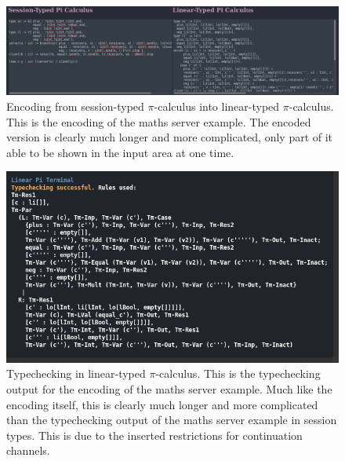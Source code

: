 \documentclass{l4proj}
\begin{document}
\begin{figure}[H]
\centering
\includegraphics[width=\textwidth]{images/InterfaceScreenshotEnc.png}
\caption{Encoding from session-typed $\pi$-calculus into linear-typed $\pi$-calculus. This is the encoding of the maths server example. The encoded version is clearly much longer and more complicated, only part of it able to be shown in the input area at one time.}
\label{fig:scshEnc}
\end{figure}
\begin{figure}[H]
\centering
\includegraphics[width=\textwidth]{images/InterfaceScreenshotLinTCh.png}
\caption{Typechecking in linear-typed $\pi$-calculus. This is the typechecking output for the encoding of the maths server example. Much like the encoding itself, this is clearly much longer and more complicated than the typechecking output of the maths server example in session types. This is due to the inserted restrictions for continuation channels.}
\label{fig:scshLTCh}
\end{figure}
\end{document}

